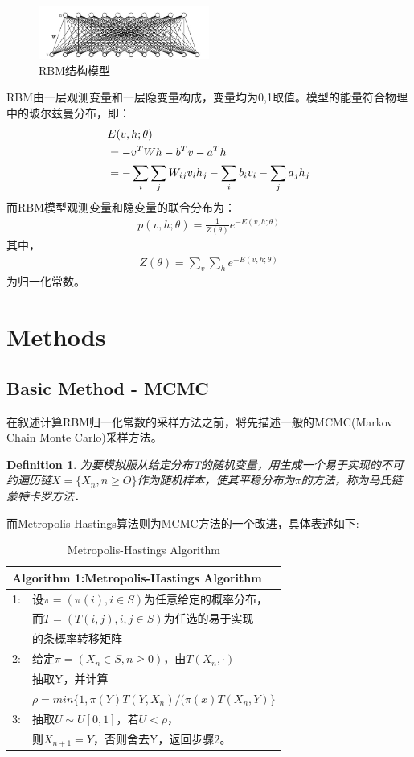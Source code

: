 \documentclass[journal,a4paper]{IEEEtran}
\newtheorem{myDef}{\textbf{Definition}}
\begin{document}
		\begin{figure}[h]
		\centering
		\includegraphics[width=0.5\textwidth]{1.jpg}
		\caption{RBM结构模型}
		\label{fig1}
		\end{figure}
	RBM由一层观测变量和一层隐变量构成，变量均为0,1取值。模型的能量符合物理中的玻尔兹曼分布，即：
		\begin{align}
		 & E(v,h;\theta) \notag \\
		 & =  -v^TWh-b^Tv-a^Th \notag \\
		 & =  -	\sum_{i}{\sum_j{ W_{ij}v_ih_j - \sum_i b_iv_i - \sum_j a_jh_j}}
		\end{align}
	而RBM模型观测变量和隐变量的联合分布为：
		\begin{align}
		p(v,h;\theta) = \frac{1}{Z(\theta)}e^{-E(v,h;\theta)}
		\end{align}
	其中，
		\begin{align}
		Z(\theta) = \sum_{v} \sum_h e^{-E(v,h;\theta)}
		\end{align}
	为归一化常数。

	\section{Methods}
	\subsection{Basic Method - MCMC}

	在叙述计算RBM归一化常数的采样方法之前，将先描述一般的MCMC(Markov Chain Monte Carlo)采样方法。
	\begin{myDef}
		为要模拟服从给定分布T的随机变量，用生成一个易于实现的不可约遍历链$ X=\{X_n,n\geq O\} $作为随机样本，使其平稳分布为$ \pi $的方法，称为马氏链蒙特卡罗方法．
	\end{myDef}
	而Metropolis-Hastings算法则为MCMC方法的一个改进，具体表述如下:

	\begin{table}[h]
	\centering
		\begin{tabular}{ll}
			\hline
			\multicolumn{2}{l}{\textbf{Algorithm 1:}Metropolis-Hastings Algorithm} \\
			\hline
			1: & 设$\pi = (\pi(i), i\in S)$为任意给定的概率分布，\\
			 & 而$ T = (T(i,j), i,j\in S)$为任选的易于实现 \\
			 & 的条概率转移矩阵\\
			2: & 给定$\pi = (X_n\in S, n\geq 0)$，由$T(X_n,·) $ \\
			 & 抽取Y，并计算\\
			 & $ \rho = min\{ 1,\pi(Y)T(Y,X_n)/(\pi(x)T(X_n,Y) \} $ \\
			3: & 抽取$ U \sim U[0,1]$，若$ U <\rho$， \\
			 & 则$ X_{n+1} = Y$，否则舍去Y，返回步骤2。\\
			\hline
		\end{tabular}
		\caption{Metropolis-Hastings Algorithm}
		\label{tab1}
	\end{table}
\end{document}
